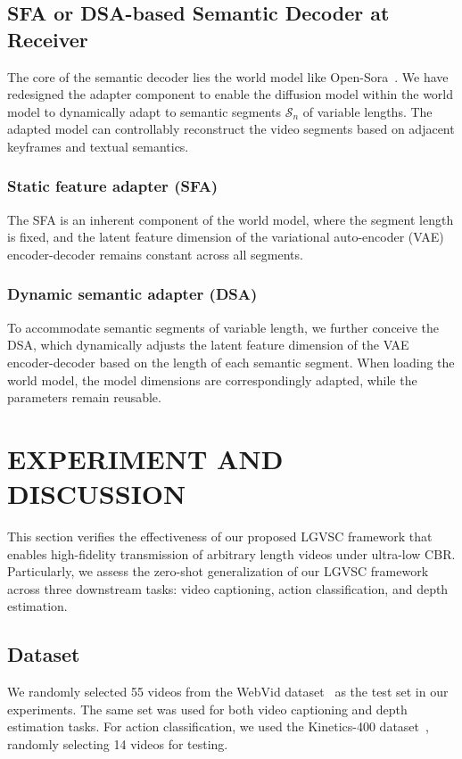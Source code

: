 \documentclass[10pt,journal]{IEEEtran}
\begin{document}
\subsection{SFA or DSA-based Semantic Decoder at Receiver}
\label{subsec:dsa}
The core of the semantic decoder lies the world model like Open-Sora~\cite{opensora}. We have redesigned the adapter component to enable the diffusion model within the world model to dynamically adapt to semantic segments $\mathcal{S}_n$ of variable lengths. The adapted model can controllably reconstruct the video segments based on adjacent keyframes and textual semantics.
\subsubsection{Static feature adapter (SFA)}
The SFA is an inherent component of the world model, where the segment length is fixed, and the latent feature dimension of the variational auto-encoder (VAE) encoder-decoder remains constant across all segments.

\subsubsection{Dynamic semantic adapter (DSA)}
To accommodate semantic segments of variable length, we further conceive the DSA, which dynamically adjusts the latent feature dimension of the VAE encoder-decoder based on the length of each semantic segment. When loading the world model, the model dimensions are correspondingly adapted, while the parameters remain reusable. 

\section{EXPERIMENT AND DISCUSSION}
\label{sec:experiment}
This section verifies the effectiveness of our proposed LGVSC framework that enables high-fidelity transmission of arbitrary length videos under ultra-low CBR. Particularly, we assess the zero-shot generalization of our LGVSC framework across three downstream tasks: video captioning, action classification, and depth estimation.

\subsection{Dataset}

We randomly selected 55 videos from the WebVid dataset~\cite{WebVid} as the test set in our experiments. The same set was used for both video captioning and depth estimation tasks. For action classification, we used the Kinetics-400 dataset~\cite{Kinetics400}, randomly selecting 14 videos for testing.
\end{document}
